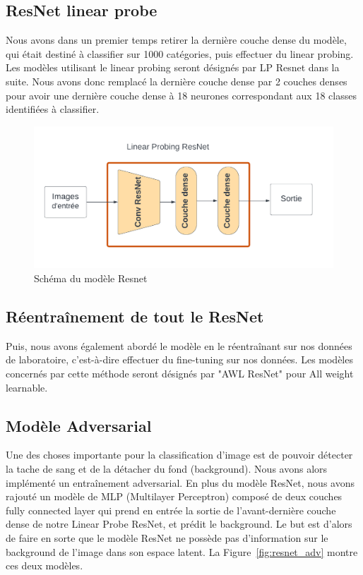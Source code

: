 \documentclass[a4paper]{article}
\begin{document}
\subsection{ResNet linear probe}
Nous avons dans un premier temps retirer la dernière couche dense du modèle, qui était destiné à classifier sur 1000 catégories, puis effectuer du linear probing. Les modèles utilisant le linear probing seront désignés par LP Resnet dans la suite. Nous avons donc remplacé la dernière couche dense par 2 couches denses pour avoir une dernière couche dense à 18 neurones correspondant aux 18 classes identifiées à classifier.

\begin{figure}[ht]
    \centering
    \includegraphics[width=1\linewidth]{../asset/Resnet.png}
    \caption{Schéma du modèle Resnet}
    \label{fig:resnet}
\end{figure}

\subsection{Réentraînement de tout le ResNet}
Puis, nous avons également abordé le modèle en le réentraînant sur nos données de laboratoire, c'est-à-dire effectuer du fine-tuning sur nos données. Les modèles concernés par cette méthode seront désignés par "AWL ResNet" pour All weight learnable.

\subsection{Modèle Adversarial}

Une des choses importante pour la classification d'image est de pouvoir détecter la tache de sang et de la détacher du fond (background). Nous avons alors implémenté un entraînement adversarial. En plus du modèle ResNet, nous avons rajouté un modèle de MLP (Multilayer Perceptron) composé de deux couches fully connected layer qui prend en entrée la sortie de l'avant-dernière couche dense de notre Linear Probe ResNet, et prédit le background. Le but est d'alors de faire en sorte que le modèle ResNet ne possède pas d'information sur le background de l'image dans son espace latent. La Figure~\ref{fig:resnet_adv} montre ces deux modèles.
\end{document}
